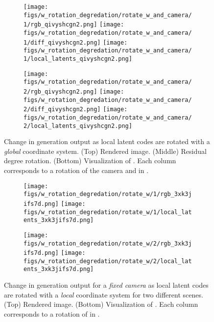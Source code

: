 \documentclass[10pt,twocolumn,letterpaper]{article}
\begin{document}
\begin{figure*}[h]
	\centering
	\begin{subfigure}{0.49\linewidth}
		\centering
		\texttt{[image: figs/w\_rotation\_degredation/rotate\_w\_and\_camera/1/rgb\_qivyshcgn2.png]}
		\texttt{[image: figs/w\_rotation\_degredation/rotate\_w\_and\_camera/1/diff\_qivyshcgn2.png]}
		\texttt{[image: figs/w\_rotation\_degredation/rotate\_w\_and\_camera/1/local\_latents\_qivyshcgn2.png]}
		
	\end{subfigure} \hfill
	\begin{subfigure}{0.49\linewidth}
		\centering
		\texttt{[image: figs/w\_rotation\_degredation/rotate\_w\_and\_camera/2/rgb\_qivyshcgn2.png]}
		\texttt{[image: figs/w\_rotation\_degredation/rotate\_w\_and\_camera/2/diff\_qivyshcgn2.png]}
		\texttt{[image: figs/w\_rotation\_degredation/rotate\_w\_and\_camera/2/local\_latents\_qivyshcgn2.png]}
	\end{subfigure}
	\caption{Change in generation output as local latent codes are rotated with a \textit{global} coordinate system. (Top) Rendered image. (Middle) Residual  degree rotation. (Bottom) Visualization of . Each column corresponds to a rotation of the camera and  in .}
	\label{fig:rotate_W_global_fix_camera}
\end{figure*}

\begin{figure*}[h]
	\centering
	\begin{subfigure}{0.49\linewidth}
		\centering
		\texttt{[image: figs/w\_rotation\_degredation/rotate\_w/1/rgb\_3xk3jifs7d.png]}
		\texttt{[image: figs/w\_rotation\_degredation/rotate\_w/1/local\_latents\_3xk3jifs7d.png]}
	\end{subfigure} \hfill
	\begin{subfigure}{0.49\linewidth}
		\centering
		\texttt{[image: figs/w\_rotation\_degredation/rotate\_w/2/rgb\_3xk3jifs7d.png]}
		\texttt{[image: figs/w\_rotation\_degredation/rotate\_w/2/local\_latents\_3xk3jifs7d.png]}
	\end{subfigure}
	\caption{Change in generation output for a \textit{fixed camera} as local latent codes are rotated with a \textit{local} coordinate system for two different scenes. (Top) Rendered image. (Bottom) Visualization of . Each column corresponds to a rotation of  in .}
	\label{fig:rotate_W_local}
\end{figure*}
\end{document}
